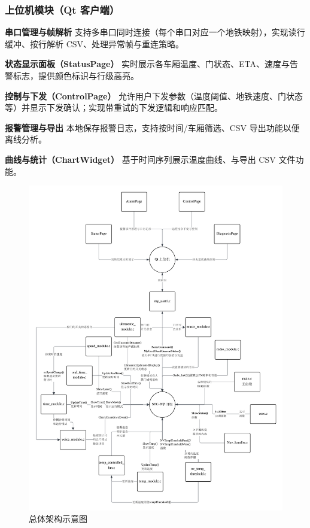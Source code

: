 \documentclass[12pt]{article}
\begin{document}
\subsubsection{上位机模块（Qt 客户端）}
\begin{description}
\item \textbf{串口管理与帧解析} 支持多串口同时连接（每个串口对应一个地铁映射），实现读行缓冲、按行解析 CSV、处理异常帧与重连策略。
\item \textbf{状态显示面板（StatusPage）} 实时展示各车厢温度、门状态、ETA、速度与告警标志，提供颜色标识与行级高亮。
\item \textbf{控制与下发（ControlPage）} 允许用户下发参数（温度阈值、地铁速度、门状态等）并显示下发确认；实现带重试的下发逻辑和响应匹配。
\item \textbf{报警管理与导出} 本地保存报警日志，支持按时间/车厢筛选、CSV 导出功能以便离线分析。
\item \textbf{曲线与统计（ChartWidget）} 基于时间序列展示温度曲线、与导出 CSV 文件功能。
\end{description}

\begin{figure}[htbp]
  \centering
  \includegraphics[width=\linewidth]{images/22-46-17.png}
  \caption{总体架构示意图}
  \label{fig:${总体架构示意图}}
\end{figure}
\end{document}
